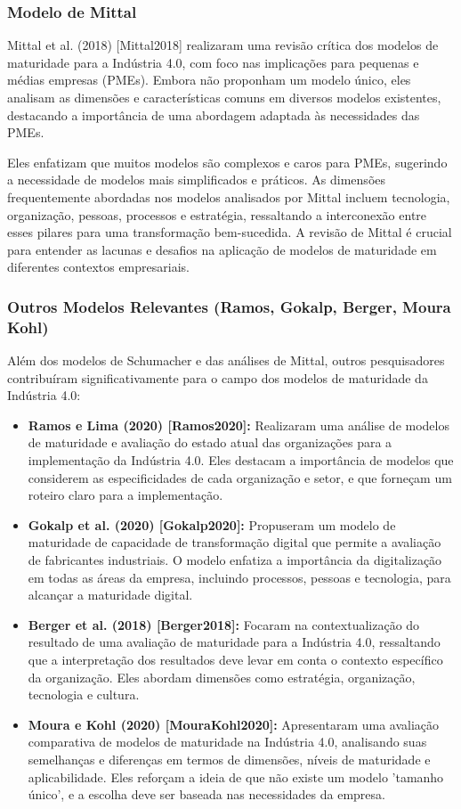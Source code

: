 \subsubsection{Modelo de Mittal}

Mittal et al. (2018) [Mittal2018] realizaram uma revisão crítica dos modelos de maturidade para a Indústria 4.0, com foco nas implicações para pequenas e médias empresas (PMEs). Embora não proponham um modelo único, eles analisam as dimensões e características comuns em diversos modelos existentes, destacando a importância de uma abordagem adaptada às necessidades das PMEs.

Eles enfatizam que muitos modelos são complexos e caros para PMEs, sugerindo a necessidade de modelos mais simplificados e práticos. As dimensões frequentemente abordadas nos modelos analisados por Mittal incluem tecnologia, organização, pessoas, processos e estratégia, ressaltando a interconexão entre esses pilares para uma transformação bem-sucedida. A revisão de Mittal é crucial para entender as lacunas e desafios na aplicação de modelos de maturidade em diferentes contextos empresariais.

\subsubsection{Outros Modelos Relevantes (Ramos, Gokalp, Berger, Moura Kohl)}

Além dos modelos de Schumacher e das análises de Mittal, outros pesquisadores contribuíram significativamente para o campo dos modelos de maturidade da Indústria 4.0:
\begin{itemize}
    \item \textbf{Ramos e Lima (2020) [Ramos2020]:} Realizaram uma análise de modelos de maturidade e avaliação do estado atual das organizações para a implementação da Indústria 4.0. Eles destacam a importância de modelos que considerem as especificidades de cada organização e setor, e que forneçam um roteiro claro para a implementação.
    \item \textbf{Gokalp et al. (2020) [Gokalp2020]:} Propuseram um modelo de maturidade de capacidade de transformação digital que permite a avaliação de fabricantes industriais. O modelo enfatiza a importância da digitalização em todas as áreas da empresa, incluindo processos, pessoas e tecnologia, para alcançar a maturidade digital.
    \item \textbf{Berger et al. (2018) [Berger2018]:} Focaram na contextualização do resultado de uma avaliação de maturidade para a Indústria 4.0, ressaltando que a interpretação dos resultados deve levar em conta o contexto específico da organização. Eles abordam dimensões como estratégia, organização, tecnologia e cultura.
    \item \textbf{Moura e Kohl (2020) [MouraKohl2020]:} Apresentaram uma avaliação comparativa de modelos de maturidade na Indústria 4.0, analisando suas semelhanças e diferenças em termos de dimensões, níveis de maturidade e aplicabilidade. Eles reforçam a ideia de que não existe um modelo 'tamanho único', e a escolha deve ser baseada nas necessidades da empresa.
\end{itemize}

